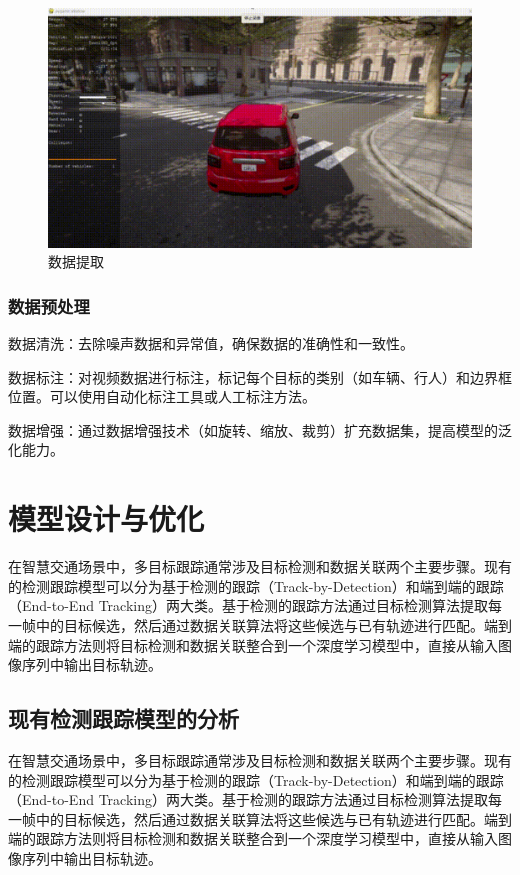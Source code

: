 \begin{figure}[htbp] %
	\centering
	\includegraphics[width=1\textwidth]{p6} %
	\caption{数据提取} %
	\label{fig:p6} %
\end{figure}



\subsubsection{数据预处理}

数据清洗：去除噪声数据和异常值，确保数据的准确性和一致性。

数据标注：对视频数据进行标注，标记每个目标的类别（如车辆、行人）和边界框位置。可以使用自动化标注工具或人工标注方法。

数据增强：通过数据增强技术（如旋转、缩放、裁剪）扩充数据集，提高模型的泛化能力\cite{bertasius2021associating}。

\section{模型设计与优化}

在智慧交通场景中，多目标跟踪通常涉及目标检测和数据关联两个主要步骤。现有的检测跟踪模型可以分为基于检测的跟踪（Track-by-Detection）和端到端的跟踪（End-to-End Tracking）两大类。基于检测的跟踪方法通过目标检测算法提取每一帧中的目标候选，然后通过数据关联算法将这些候选与已有轨迹进行匹配。端到端的跟踪方法则将目标检测和数据关联整合到一个深度学习模型中，直接从输入图像序列中输出目标轨迹\cite{li2019v4}。

\subsection{现有检测跟踪模型的分析}
在智慧交通场景中，多目标跟踪通常涉及目标检测和数据关联两个主要步骤。现有的检测跟踪模型可以分为基于检测的跟踪（Track-by-Detection）和端到端的跟踪（End-to-End Tracking）两大类。基于检测的跟踪方法通过目标检测算法提取每一帧中的目标候选，然后通过数据关联算法将这些候选与已有轨迹进行匹配。端到端的跟踪方法则将目标检测和数据关联整合到一个深度学习模型中，直接从输入图像序列中输出目标轨迹\cite{尹誉翔 2024 基于Carla仿真平台的YOLOv5多目标检测研究}。

